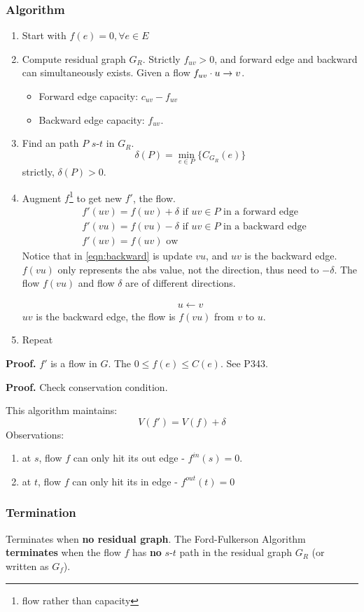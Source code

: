 \documentclass[a4paper]{report}
\theoremstyle{definition}
\begin{document}
\subsubsection{Algorithm}
\begin{enumerate}
\item Start with $f(e)=0, \forall e \in E$
\item Compute residual graph $G_R$. Strictly $f_{uv}>0$, and forward edge and backward can simultaneously exists. Given a flow $f_{uv} \cdot u \rightarrow v$.
\begin{itemize}
\item Forward edge capacity: $c_{uv}-f_{uv}$
\item Backward edge capacity: $f_{uv}$.
\end{itemize}
\item Find an path $P$ $s$-$t$ in $G_R$.
$$\delta(P)=\min_{e\in P} \{C_{G_R}(e)\}$$
strictly, $\delta(P)>0$.
\item Augment $f$\footnote{flow rather than capacity} to get new $f'$, the flow.
\begin{align}
& f'(uv)= f(uv)+\delta \text{ if $uv\in P$ in a forward edge}\\
& f'(vu)= f(vu)-\delta \text{ if $uv \in P$ in a backward edge} \label{eqn:backward}\\
& f'(uv)=f(uv) \text{ ow}
\end{align}
Notice that in \ref{eqn:backward} is update $vu$, and $uv$ is the backward edge. $f(vu)$ only represents the abs value, not the direction, thus need to $-\delta$. The flow $f(vu)$ and flow $\delta$ are of different directions.


\begin{align*}
u \leftarrow v
\end{align*}
$uv$ is the backward edge, the flow is $f(vu)$ from $v$ to $u$. 
\item Repeat
\end{enumerate}
\textbf{Proof.} $f'$ is a flow in $G$. The $0\leq f(e)\leq C(e)$. See P343.

\textbf{Proof.} Check conservation condition.


This algorithm maintains:
$$
V(f')= V(f)+\delta
$$
Observations:
\begin{enumerate}
\item at $s$, flow $f$ can only hit its out edge - $f^{in}(s)=0$.
\item at $t$, flow $f$ can only hit its in edge - $f^{out}(t)=0$
\end{enumerate}
\subsubsection{Termination}
Terminates when \textbf{no residual graph}. The Ford-Fulkerson Algorithm \textbf{terminates}
when the flow $f$ has \textbf{no} $s$-$t$ path in the residual graph $G_R$ (or written
as $G_f$).
\end{document}
